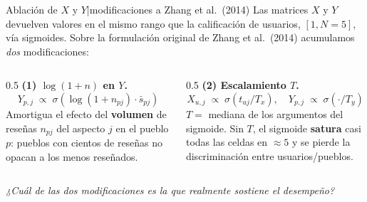 \documentclass[aspectratio=169,11pt]{beamer}
\begin{document}
\begin{frame}{Ablaci\'on de $X$ y $Y$\;|\;modificaciones a Zhang et al.\ (2014)}
	\small
	Las matrices $X$ y $Y$ devuelven valores en el mismo rango que la calificaci\'on
	de usuarios, $[1, N{=}5]$, v\'ia sigmoides. Sobre la formulaci\'on original
	de Zhang et al.\ (2014) acumulamos \emph{dos} modificaciones:

	\vspace{0.6em}
	\begin{columns}[T]
		\begin{column}{0.5\linewidth}
			\textbf{(1) $\log(1+n)$ en $Y$.}
			\[
				Y_{p,j}\;\propto\;\sigma\!\left(\log(1+n_{pj})\cdot \bar{s}_{pj}\right)
			\]
			Amortigua el efecto del \textbf{volumen} de rese\~nas
			$n_{pj}$ del aspecto $j$ en el pueblo $p$: pueblos con cientos de
			rese\~nas no opacan a los menos rese\~nados.
		\end{column}
		\begin{column}{0.5\linewidth}
			\textbf{(2) Escalamiento $T$.}
			\[
				X_{u,j}\;\propto\;\sigma\!\left(t_{uj}/T_x\right),\quad
				Y_{p,j}\;\propto\;\sigma\!\left(\cdot/T_y\right)
			\]
			$T=$ mediana de los argumentos del sigmoide. Sin $T$, el sigmoide
			\textbf{satura} casi todas las celdas en $\approx 5$ y se pierde la
			discriminaci\'on entre usuarios/pueblos.
		\end{column}
	\end{columns}

	\vspace{0.8em}
	\centering
	\textit{¿Cu\'al de las dos modificaciones es la que realmente sostiene el desempe\~no?}
\end{frame}
\end{document}
